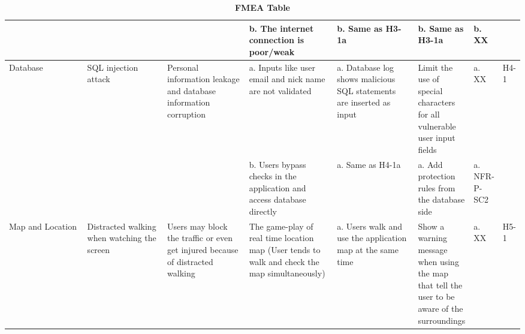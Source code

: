 \documentclass{article}
\begin{document}
\begin{table}[H]
\begin{adjustbox}{width=(/5)}
\begin{tabular}{|p{0.20\linewidth} | p{0.20\linewidth} | p{0.20\linewidth}|  p{0.20\linewidth}|  p{0.21\linewidth}|  p{0.30\linewidth}|  p{0.08\linewidth}|p{0.07\linewidth}| }
        &&&  b. The internet connection is poor/weak    &        b. Same as H3-1a         &  b. Same as H3-1a           &  b. XX           &\\
          \hline
          Database           &    SQL injection attack         &           Personal information leakage and database information corruption           &           a. Inputs like user email and nick name are not validated           &           a. Database log shows malicious SQL statements are inserted as input           &     Limit the use of special characters for all vulnerable user input fields     &   a. XX          &      H4-1            \\
                                   &&&           b. Users bypass checks in the application and access database directly            &            a. Same as H4-1a            &            a. Add protection rules from the database side      &  a. NFR-P-SC2           &\\
          \hline
          Map and Location           &    Distracted walking when watching the screen         &           Users may block the traffic or even get injured because of distracted walking           &           The game-play of real time location map (User tends to walk and check the map simultaneously)           &           a. Users walk and use the application map at the same time           &     Show a warning message when using the map that tell the user to be aware of the surroundings     &   a. XX          &      H5-1            \\
          \hline
    \end{tabular}
    \end{adjustbox}
    \caption{\bf FMEA Table}
    \label{tab:FMEA1}
\end{table}
\end{document}
